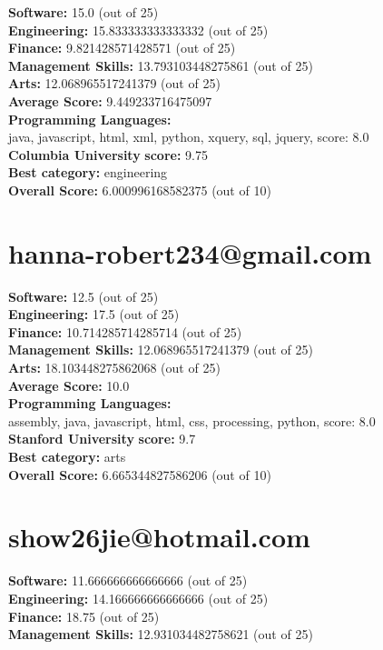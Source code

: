 \documentclass{article}
\begin{document}
\textbf{Software:} 15.0 (out of 25)\\
\textbf{Engineering: } 15.833333333333332 (out of 25)\\
\textbf{Finance:} 9.821428571428571 (out of 25)\\
\textbf{Management Skills:} 13.793103448275861 (out of 25)\\
\textbf{Arts:} 12.068965517241379 (out of 25)\\
\textbf{Average Score: } 9.449233716475097\\
\textbf{Programming Languages:} \\
java, javascript, html, xml, python, xquery, sql, jquery, score: 8.0\\
\textbf{Columbia University} \textbf{score:} 9.75\\
\textbf{Best category: } engineering\\
\textbf{Overall Score: }6.000996168582375 (out of 10)\section{hanna-robert234@gmail.com}
\textbf{Software:} 12.5 (out of 25)\\
\textbf{Engineering: } 17.5 (out of 25)\\
\textbf{Finance:} 10.714285714285714 (out of 25)\\
\textbf{Management Skills:} 12.068965517241379 (out of 25)\\
\textbf{Arts:} 18.103448275862068 (out of 25)\\
\textbf{Average Score: } 10.0\\
\textbf{Programming Languages:} \\
assembly, java, javascript, html, css, processing, python, score: 8.0\\
\textbf{Stanford University} \textbf{score:} 9.7\\
\textbf{Best category: } arts\\
\textbf{Overall Score: }6.665344827586206 (out of 10)\section{show26jie@hotmail.com}
\textbf{Software:} 11.666666666666666 (out of 25)\\
\textbf{Engineering: } 14.166666666666666 (out of 25)\\
\textbf{Finance:} 18.75 (out of 25)\\
\textbf{Management Skills:} 12.931034482758621 (out of 25)\\
\end{document}
